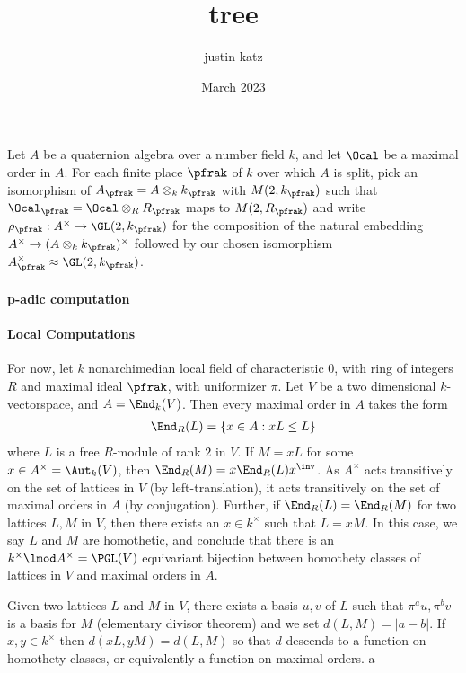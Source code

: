 \documentclass{article}
\title{tree}
\author{justin katz}
\date{March 2023}
\begin{document}
Let $A$ be a quaternion algebra over a number field $k$, and let $\Ocal$ be a maximal order in $A$. For each finite place $\pfrak$ of $k$ over which $A$ is split, pick an isomorphism of $A_\pfrak =A\otimes_k k_\pfrak$ with $M(2,k_\pfrak)$ such that $\Ocal_\pfrak = \Ocal \otimes_R R_\pfrak$ maps to $M(2,R_\pfrak)$ and write $\rho_\pfrak:A^\times \to \GL(2,k_\pfrak)$ for the composition of the natural embedding $A^\times \to (A\otimes_k k_\pfrak)^\times$ followed by our chosen isomorphism $A_\pfrak^\times \approx \GL(2,k_\pfrak)$. 

\paragraph*{p-adic computation}
\begin{definition}

    
\end{definition}


\paragraph*{Local Computations} 
For now, let $k$ nonarchimedian local field of characteristic $0$, with ring of integers $R$ and maximal ideal $\pfrak$, with uniformizer $\pi$. Let $V$ be a two dimensional $k$-vectorspace, and $A = \End_k(V)$. Then every maximal order in $A$ takes the form 
\begin{align*}
    \End_R(L) = \{ x \in A : xL\leq L\}
\end{align*}
where $L$ is a free $R$-module of rank $2$ in $V$. If $M = xL$ for some $x\in A^\times = \Aut_k(V)$, then $\End_R(M) = x\End_R(L)x^\inv$. As $A^\times$ acts transitively on the set of lattices in $V$ (by left-translation), it acts transitively on the set of maximal orders in $A$ (by conjugation). Further, if $\End_R(L)=\End_R(M)$ for two lattices $L,M$ in $V$, then there exists an $x \in k^\times$ such that $L = x M$. In this case, we say $L$ and $M$ are homothetic, and conclude that there is an $k^\times \lmod A^\times = \PGL(V)$ equivariant bijection between homothety classes of lattices in $V$ and maximal orders in $A$. 

Given two lattices $L$ and $M$ in $V$, there exists a basis $u,v$ of $L$ such that $\pi^a u , \pi^b v$ is a basis for $M$ (elementary divisor theorem) and we set $d(L,M) = |a-b|$. If $x,y\in k^\times$ then $d(xL,yM)=d(L,M)$ so that $d$ descends to a function on homothety classes, or equivalently a function on maximal orders. a


\end{document}
